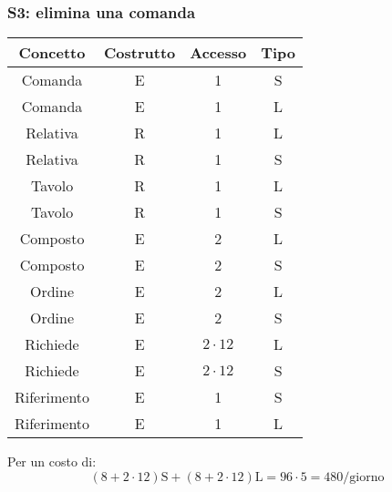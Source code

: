 \documentclass[a4paper,12pt]{report}
\begin{document}
\subsubsection{S3: elimina una comanda}
\begin{table}[H]
    \centering
    \begin{tabular}{|| c | c | c | c ||}
        \hline
        Concetto & Costrutto & Accesso & Tipo\\
        \hline
        Comanda & E & 1 & S\\
        \hline
        Comanda & E & 1 & L\\
        \hline
        Relativa & R & 1 & L\\
        \hline
        Relativa & R & 1 & S\\
        \hline
        Tavolo & R & 1 & L\\
        \hline
        Tavolo & R & 1 & S\\
        \hline
        Composto & E & 2 & L\\
        \hline
        Composto & E & 2 & S\\
        \hline
        Ordine & E & 2 & L\\
        \hline
        Ordine & E & 2 & S\\
        \hline
        Richiede & E & \begin{math}2 \cdot 12\end{math} & L \\
        \hline
        Richiede & E & \begin{math}2 \cdot 12\end{math} & S\\
        \hline
        Riferimento & E & 1 & S\\
        \hline
        Riferimento & E & 1 & L\\
        \hline
    \end{tabular}
\end{table}
%
Per un costo di:
%
\begin{equation}
    (8 + 2 \cdot 12 ) \text{S} + (8 + 2 \cdot 12 ) \text{L}
 =  96 \cdot 5 = 480\text{/giorno}
\end{equation}
\end{document}
